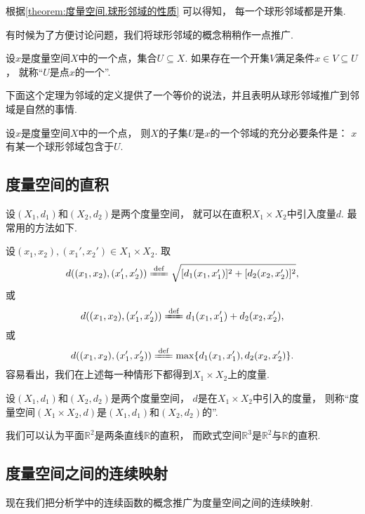 根据\cref{theorem:度量空间.球形邻域的性质} 可以得知，
每一个球形邻域都是开集.

有时候为了方便讨论问题，我们将球形邻域的概念稍稍作一点推广.
\begin{definition}\label{definition:度量空间.邻域的概念}
设\(x\)是度量空间\(X\)中的一个点，集合\(U \subseteq X\).
如果存在一个开集\(V\)满足条件\(x \in V \subseteq U\)，
就称“\(U\)是点\(x\)的一个”.
\end{definition}
下面这个定理为邻域的定义提供了一个等价的说法，并且表明从球形邻域推广到邻域是自然的事情.
\begin{theorem}
设\(x\)是度量空间\(X\)中的一个点，
则\(X\)的子集\(U\)是\(x\)的一个邻域的充分必要条件是：
\(x\)有某一个球形邻域包含于\(U\).
\end{theorem}

\subsection{度量空间的直积}
\begingroup
\def\A{X_1}\def\B{X_2}
\def\dA{d_1}\def\dB{d_2}
\def\X{(x_1,x_2)}
\def\Y{(x_1',x_2')}
\def\dAA{d_1(x_1,x_1')}
\def\dBB{d_2(x_2,x_2')}
设\((X_1,d_1)\)和\((X_2,d_2)\)是两个度量空间，
就可以在直积\(X_1 \times X_2\)中引入度量\(d\).
最常用的方法如下.

设\(\X,\Y\in X_1 \times X_2\).
取\[
	d(\X,\Y)
	\defeq
	\sqrt{[\dAA]^2+[\dBB]^2},
\]
或\[
	d(\X,\Y)
	\defeq
	\dAA+\dBB,
\]
或\[
	d(\X,\Y)
	\defeq
	\max\{\dAA,\dBB\}.
\]
容易看出，我们在上述每一种情形下都得到\(X_1 \times X_2\)上的度量.

\begin{definition}
设\((X_1,d_1)\)和\((X_2,d_2)\)是两个度量空间，
\(d\)是在\(X_1 \times X_2\)中引入的度量，
则称“度量空间\((X_1 \times X_2,d)\)是\((X_1,d_1)\)和\((X_2,d_2)\)的”.
\end{definition}

\begin{example}
我们可以认为平面\(\mathbb{R}^2\)是两条直线\(\mathbb{R}\)的直积，
而欧式空间\(\mathbb{R}^3\)是\(\mathbb{R}^2\)与\(\mathbb{R}\)的直积.
\end{example}
\endgroup

\subsection{度量空间之间的连续映射}
现在我们把分析学中的连续函数的概念推广为度量空间之间的连续映射.

